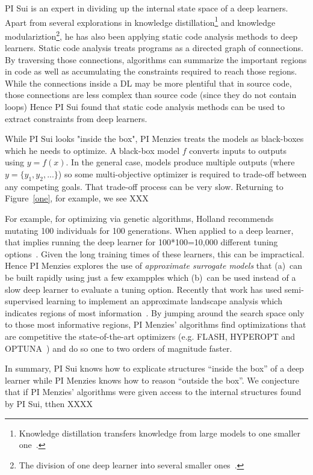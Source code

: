 PI Sui is an expert in dividing up the internal state space of a deep learners. Apart from several explorations in knowledge
distillation\footnote{Knowledge distillation transfers knowledge from   large models to  one smaller one~\cite{yim2017gift}.}
and knowledge modulariztion\footnote{The division of one deep learner into several smaller ones~\cite{Tduan2021modularizing}.},
he has also been applying static code analysis methods to deep learners. 
Static code analysis treats programs as a directed graph of connections. By traversing those connections, algorithms
can summarize the important regions in code as well as accumulating the constraints required to reach those regions.
 While the connections
inside a DL may be more plentiful that in source code, those connections are less complex than source code
(since they do not contain loops)
Hence PI Sui found that static code analysis methods  can be used to extract constraints from deep learners.

While PI Sui looks "inside the box", PI Menzies treats the models as black-boxes which he needs to optimize.
A black-box model $f$ converts inputs to outputs using $y=f(x)$. In the general case, models produce multiple outputs
(where $y=\{y_1,y_2,...\}$) so some multi-objective optimizer is required to trade-off between any competing goals.
That trade-off process can be very slow. Returning to Figure~\ref{one}, for example, we see XXX


For example, for optimizing via genetic algorithms, Holland recommends mutating
100 individuals for 100 generations. When applied to a deep learner, that implies running the deep learner for 100*100=10,000
different tuning options~\cite{holland1992genetic}. Given the long training times of these learners, this can be impractical.
Hence PI Menzies explores the use of {\em approximate surrogate models} that (a)~can be built rapidly using just a  few exampples
which (b)~can be used instead of a slow deep learner to evaluate a tuning option. Recently that work has used
semi-supervised learning to implement an approximate landscape analysis which indicates regions of most information~\cite{lustosa21,lustosa22}. By jumping
around the search space only to those most informative regions, PI Menzies' algorithms 
find optimizations that are competitive the 
state-of-the-art   optimizers (e.g.
FLASH, HYPEROPT and OPTUNA~\cite{bergstra11TPE,nair2018finding,akiba2019optuna}) and do so
one to  two orders of magnitude faster.


In summary, PI Sui knows how to explicate structures ``inside the box'' of a deep learner while PI Menzies knows how to reason
``outside the box''. We conjecture that if PI Menzies' algorithms were given access to the internal structures found by PI Sui,
tthen XXXX

